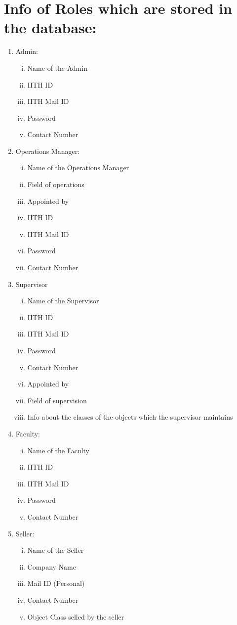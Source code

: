 \documentclass[12pt,a4paper]{article}
\begin{document}
\newpage

\section*{Info of Roles which are stored in the database:}
\begin{enumerate}
\item Admin:
\begin{enumerate}[i)]
\item Name of the Admin
\item IITH ID
\item IITH Mail ID
\item Password
\item Contact Number
\end{enumerate}

\item Operations Manager:
\begin{enumerate}[i)]
\item Name of the Operations Manager
\item Field of operations
\item Appointed by 
\item IITH ID
\item IITH Mail ID
\item Password
\item Contact Number
\end{enumerate}

\item Supervisor
\begin{enumerate}[i)]
\item Name of the Supervisor
\item IITH ID
\item IITH Mail ID
\item Password
\item Contact Number
\item Appointed by
\item Field of supervision
\item Info about the classes of the objects which the supervisor maintains
\end{enumerate}

\item Faculty:
\begin{enumerate}[i)]
\item Name of the Faculty
\item IITH ID
\item IITH Mail ID
\item Password
\item Contact Number
\end{enumerate}

\item Seller:
\begin{enumerate}[i)]
\item Name of the Seller
\item Company Name
\item Mail ID (Personal)
\item Contact Number
\item Object Class selled by the seller
\end{enumerate}
\end{enumerate}
\newpage
\end{document}
